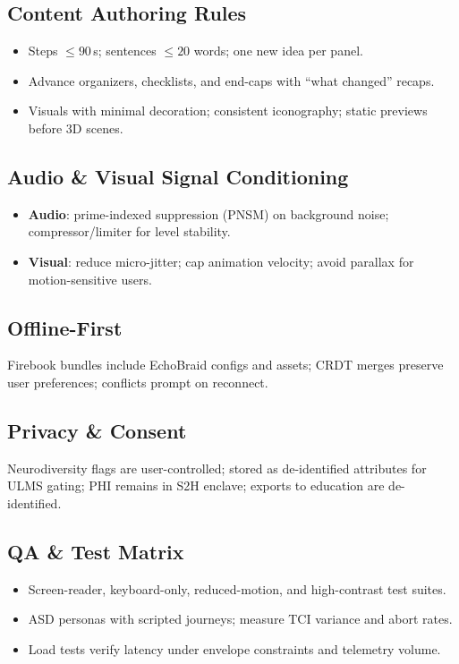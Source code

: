 \documentclass[11pt]{article}
\theoremstyle{plain}
\begin{document}
\subsection{Content Authoring Rules}
\begin{itemize}
  \item Steps $\le 90$\,s; sentences $\le 20$ words; one new idea per panel.
  \item Advance organizers, checklists, and end-caps with “what changed” recaps.
  \item Visuals with minimal decoration; consistent iconography; static previews before 3D scenes.
\end{itemize}

\subsection{Audio \& Visual Signal Conditioning}
\begin{itemize}
  \item \textbf{Audio}: prime-indexed suppression (PNSM) on background noise; compressor/limiter for level stability.
  \item \textbf{Visual}: reduce micro-jitter; cap animation velocity; avoid parallax for motion-sensitive users.
\end{itemize}

\subsection{Offline-First}
Firebook bundles include EchoBraid configs and assets; CRDT merges preserve user preferences; conflicts prompt on reconnect.

\subsection{Privacy \& Consent}
Neurodiversity flags are user-controlled; stored as de-identified attributes for ULMS gating; PHI remains in S2H enclave; exports to education are de-identified.

\subsection{QA \& Test Matrix}
\begin{itemize}
  \item Screen-reader, keyboard-only, reduced-motion, and high-contrast test suites.
  \item ASD personas with scripted journeys; measure TCI variance and abort rates.
  \item Load tests verify latency under envelope constraints and telemetry volume.
\end{itemize}
\end{document}
